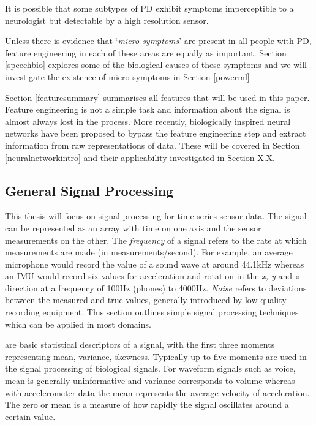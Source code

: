 \documentclass[12pt, twoside]{book}
\renewcommand\emph[1]{\textit{\color{USred}{#1}}}
\begin{document}
\begin{highlight}
It is possible that some subtypes of PD exhibit symptoms imperceptible to a neurologist but detectable by a high resolution sensor. 
\end{highlight}

Unless there is evidence that `\textit{micro-symptoms}' are present in all people with PD, feature engineering in each of these areas are equally as important. Section \ref{speechbio} explores some of the biological causes of these symptoms and we will investigate the existence of  micro-symptoms in Section \ref{powerml}


Section \ref{featuresummary} summarises all features that will be used in this paper. Feature engineering is not a simple task and information about the signal is almost always lost in the process. More recently, biologically inspired neural networks have been proposed to bypass the feature engineering step and extract information from raw representations of data. These will be covered in Section \ref{neuralnetworkintro} and their applicability investigated in Section X.X.

\subsection{General Signal Processing}
\label{generalsignalproc}
This thesis will focus on signal processing for time-series sensor data. The signal can be represented as an array with time on one axis and the sensor measurements on the other. The \textit{frequency} of a signal refers to the rate at which measurements are made (in measurements/second). For example, an average microphone would record the value of a sound wave at around 44.1kHz whereas an IMU would record six values for acceleration and rotation in the \textit{x, y} and \textit{z} direction at a frequency of 100Hz (phones) to 4000Hz. \textit{Noise} refers to deviations between the measured and true values, generally introduced by low quality recording equipment. This section outlines simple signal processing techniques which can be applied in most domains.


\emph{Moments} are basic statistical descriptors of a signal, with the first three moments representing mean, variance, skewness. Typically up to five moments are used in the signal processing of biological signals. For waveform signals such as voice, mean is generally uninformative and variance corresponds to volume whereas with accelerometer data the mean represents the average velocity of acceleration.  The zero or mean \emph{crossing rate} is a measure of how rapidly the signal oscillates around a certain value.
\end{document}
